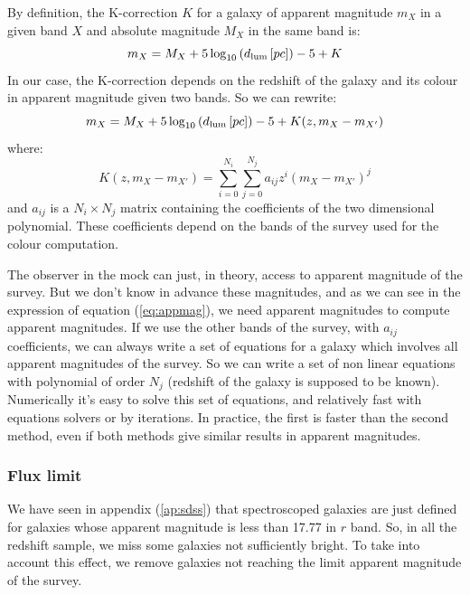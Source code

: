 By definition, the K-correction $K$ for a galaxy of apparent magnitude $m_X$
in a given band $X$ and absolute magnitude $M_X$ in the same band is:
%
\begin{equation}
    {m_X}={M_X} + {5\log_{10}\left({d_{\mathrm{lum}}\left[pc\right]}\right)} - 5 + K
\end{equation}
%
In our case, the K-correction depends on the redshift of the galaxy and its
colour in apparent magnitude given two bands. So we can rewrite:
%
\begin{equation}\label{eq:appmag}
    m_X = M_X + 5\log_{10}\left({d_{\mathrm{lum}}\left[pc\right]}\right) - 5 + K( z, m_X - m_{X'} )
\end{equation}
%
where:
%
\begin{equation}
    K(z,m_{X}-{m}_{X'})=\sum_{i=0}^{N_i}\sum_{j=0}^{N_j}{a_{ij}}{z^i}{{(m_X-{m}_{X'})}^j}
\end{equation}
%
and $a_{ij}$ is a ${N_i}\times{N_j}$ matrix containing the coefficients of the
two dimensional polynomial. These coefficients depend on the bands of the
survey used for the colour computation.

The observer in the mock can just, in theory, access to apparent magnitude
of the survey. But we don't know in advance these magnitudes, and as we can
see in the expression of equation (\ref{eq:appmag}), we need apparent
magnitudes to compute apparent magnitudes. If we use the other bands of the
survey, with $a_{ij}$ coefficients, we can always write a set of equations
for a galaxy which involves all apparent magnitudes of the survey. So we can
write a set of non linear equations with polynomial of order $N_j$ (redshift
of the galaxy is supposed to be known). Numerically it's easy to solve this
set of equations, and relatively fast with equations solvers or by
iterations. In practice, the first is faster than the second method, even if
both methods give similar results in apparent magnitudes.
%
\subsubsection{Flux limit}
%
We have seen in appendix (\ref{ap:sdss}) that spectroscoped galaxies are just
defined for galaxies whose apparent magnitude is less than 17.77 in $r$
band. So, in all the redshift sample, we miss some galaxies not sufficiently
bright. To take into account this effect, we remove galaxies not reaching
the limit apparent magnitude of the survey.
%
